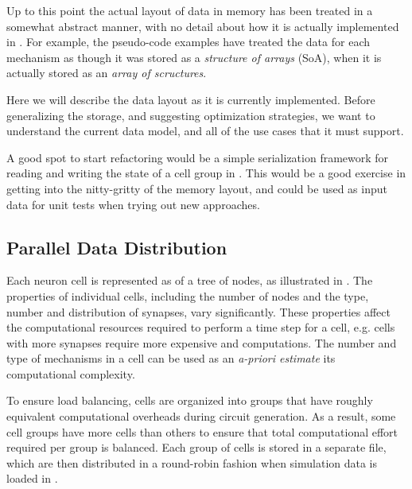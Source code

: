 Up to this point the actual layout of data in memory has been treated in a somewhat abstract manner, with no detail about how it is actually implemented in \neuron.
For example, the pseudo-code examples have treated the data for each mechanism as though it was stored as a \emph{structure of arrays} (SoA), when it is actually stored as an \emph{array of scructures}.

Here we will describe the data layout as it is currently implemented. Before generalizing the storage, and suggesting optimization strategies, we want to understand the current data model, and all of the use cases that it must support.

\begin{note}
A good spot to start refactoring would be a simple serialization framework for reading and writing the state of a cell group in \neuron. This would be a good exercise in getting into the nitty-gritty of the memory layout, and could be used as input data for unit tests when trying out new approaches.
\end{note}

\subsection{Parallel Data Distribution}
Each neuron cell is represented as of a tree of nodes, as illustrated in .
The properties of individual cells, including the number of nodes and the type, number and distribution of synapses, vary significantly.
These properties affect the computational resources required to perform a time step for a cell, e.g. cells with more synapses require more expensive  and  computations.
The number and type of mechanisms in a cell can be used as an \textit{a-priori estimate} its computational complexity.

To ensure load balancing, cells are organized into groups that have roughly equivalent computational overheads during circuit generation.
As a result, some cell groups have more cells than others to ensure that total computational effort required per group is balanced.
Each group of cells is stored in a separate  file, which are then distributed in a round-robin fashion when simulation data is loaded in .

